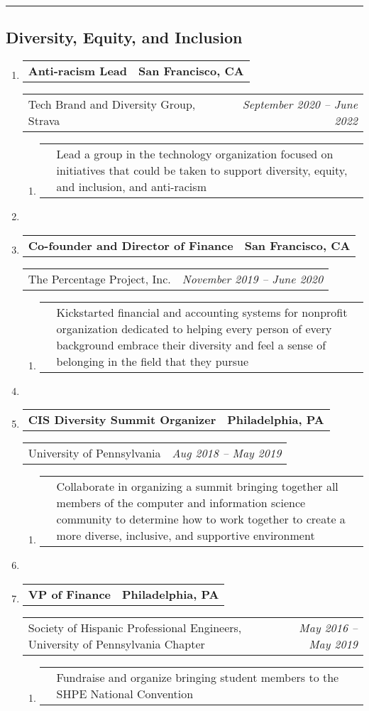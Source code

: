 \documentclass[letterpaper]{article}
\makeatletter
\newcommand*{\tabulardef}[3]{\begin{tabular}[t]{@{}lp{\dimexpr\linewidth-#1}@{}}
    #2&#3
\end{tabular}}
\newcommand{\headerrow}[2]
{\begin{tabular*}{\linewidth}{l@{\extracolsep{\fill}}r}
	#1 &
	#2 \\
\end{tabular*}}
\makeatother
\begin{document}
\hrule

\subsection*{Diversity, Equity, and Inclusion}
\begin{enumerate}[label=]
	\parskip=-0.25em
	\item
		\headerrow
			{\textbf{Anti-racism Lead}}
			{\textbf{San Francisco, CA}}
	\headerrow
		{Tech Brand and Diversity Group, Strava}
		{\emph{September 2020 -- June 2022}}
	\begin{enumerate}[label= *]
	\parskip=-0.1em
		\item\tabulardef{5cm}{}{Lead a group in the technology organization focused on initiatives that could be taken to support diversity, equity, and inclusion, and anti-racism}
	\end{enumerate}

    \item
 
	\item
		\headerrow
			{ \textbf{Co-founder and Director of Finance}}
			{\textbf{San Francisco, CA}}
	\headerrow
		{The Percentage Project, Inc.}
		{\emph{November 2019 -- June 2020}}
	\begin{enumerate}[label= *]
	\parskip=-0.1em
		\item\tabulardef{5cm}{}{Kickstarted financial and accounting systems for nonprofit organization dedicated to helping every person of every background embrace their diversity and feel a sense of belonging in the field that they pursue}
	\end{enumerate}

    \item

	\item
		\headerrow
			{\textbf{CIS Diversity Summit Organizer}}
			{\textbf{Philadelphia, PA}}
	\headerrow
		{University of Pennsylvania}
		{\emph{Aug 2018 -- May 2019}}
	\begin{enumerate}[label= *]
	\parskip=-0.1em
		\item\tabulardef{5cm}{}{Collaborate in organizing a summit bringing together all members of the computer and information science community to determine how to work together to create a more diverse, inclusive, and supportive environment}
	\end{enumerate}

    \item

	\item
		\headerrow
			{\textbf{VP of Finance}}
			{\textbf{Philadelphia, PA}}
	\headerrow
		{Society of Hispanic Professional Engineers, University of Pennsylvania Chapter}
		{\emph{May 2016 -- May 2019}}
	\begin{enumerate}[label= *]
	\parskip=-0.1em
		\item\tabulardef{5cm}{}{Fundraise and organize bringing student members to the SHPE National Convention}
	\end{enumerate}
\end{enumerate}
\end{document}
